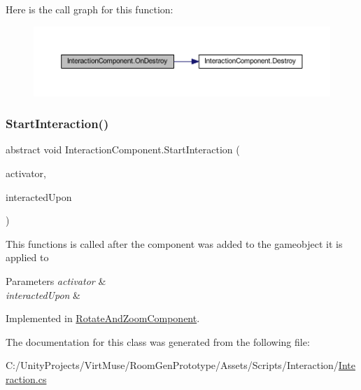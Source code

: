 Here is the call graph for this function\+:
\nopagebreak
\begin{figure}[H]
\begin{center}
\leavevmode
\includegraphics[width=350pt]{class_interaction_component_a3add77b0cb9df6b962ea2c66d317fa46_cgraph}
\end{center}
\end{figure}
\mbox{\label{class_interaction_component_a80d4c2288af453dd9611bbea092843e5}} 
\subsubsection{\texorpdfstring{Start\+Interaction()}{StartInteraction()}}
{\footnotesize\ttfamily abstract void Interaction\+Component.\+Start\+Interaction (\begin{DoxyParamCaption}\item[{Game\+Object}]{activator,  }\item[{Game\+Object}]{interacted\+Upon }\end{DoxyParamCaption})\hspace{0.3cm}{\ttfamily [pure virtual]}}



This functions is called after the component was added to the gameobject it is applied to 


\begin{DoxyParams}{Parameters}
{\em activator} & \\
\hline
{\em interacted\+Upon} & \\
\hline
\end{DoxyParams}


Implemented in \mbox{\hyperlink{class_rotate_and_zoom_component_ac6afb9569858cf59c584c7bdfac41def}{Rotate\+And\+Zoom\+Component}}.



The documentation for this class was generated from the following file\+:\begin{DoxyCompactItemize}
\item 
C\+:/\+Unity\+Projects/\+Virt\+Muse/\+Room\+Gen\+Prototype/\+Assets/\+Scripts/\+Interaction/\mbox{\hyperlink{_interaction_8cs}{Interaction.\+cs}}\end{DoxyCompactItemize}
